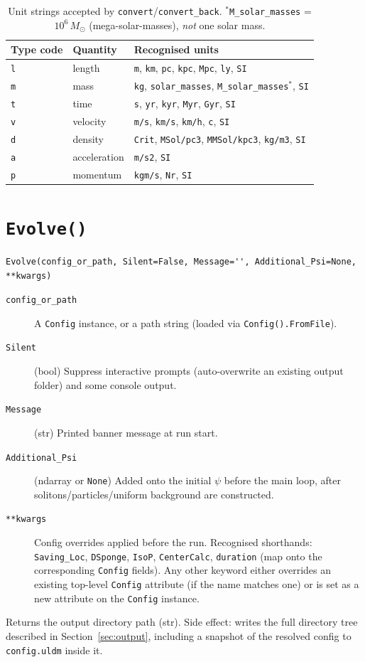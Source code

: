 \documentclass[11pt]{article}
\newcommand{\code}[1]{\texttt{#1}}
\newcommand{\field}[1]{\texttt{#1}}
\begin{document}
\begin{table}[h]
\centering
\begin{tabular}{@{}lll@{}}
\toprule
Type code & Quantity & Recognised units \\
\midrule
\code{l} & length & \code{m}, \code{km}, \code{pc}, \code{kpc}, \code{Mpc}, \code{ly}, \code{SI} \\
\code{m} & mass & \code{kg}, \code{solar\_masses}, \code{M\_solar\_masses}$^*$, \code{SI} \\
\code{t} & time & \code{s}, \code{yr}, \code{kyr}, \code{Myr}, \code{Gyr}, \code{SI} \\
\code{v} & velocity & \code{m/s}, \code{km/s}, \code{km/h}, \code{c}, \code{SI} \\
\code{d} & density & \code{Crit}, \code{MSol/pc3}, \code{MMSol/kpc3}, \code{kg/m3}, \code{SI} \\
\code{a} & acceleration & \code{m/s2}, \code{SI} \\
\code{p} & momentum & \code{kgm/s}, \code{Nr}, \code{SI} \\
\bottomrule
\end{tabular}
\caption{Unit strings accepted by \code{convert}/\code{convert\_back}.
$^*$\code{M\_solar\_masses} = $10^6\,M_\odot$ (mega-solar-masses), \emph{not}
one solar mass.}
\label{tab:units}
\end{table}

\section{\code{Evolve()}}
\label{sec:evolve}

\begin{verbatim}
Evolve(config_or_path, Silent=False, Message='', Additional_Psi=None, **kwargs)
\end{verbatim}
\begin{description}
  \item[\field{config\_or\_path}] A \code{Config} instance, or a path string
    (loaded via \code{Config().FromFile}).
  \item[\field{Silent}] (bool) Suppress interactive prompts (auto-overwrite an
    existing output folder) and some console output.
  \item[\field{Message}] (str) Printed banner message at run start.
  \item[\field{Additional\_Psi}] (ndarray or \code{None}) Added onto the
    initial $\psi$ before the main loop, after solitons/particles/uniform
    background are constructed.
  \item[\field{**kwargs}] Config overrides applied before the run. Recognised
    shorthands: \field{Saving\_Loc}, \field{DSponge}, \field{IsoP},
    \field{CenterCalc}, \field{duration} (map onto the corresponding
    \code{Config} fields). Any other keyword either overrides an existing
    top-level \code{Config} attribute (if the name matches one) or is set as a
    new attribute on the \code{Config} instance.
\end{description}
Returns the output directory path (str). Side effect: writes the full
directory tree described in Section~\ref{sec:output}, including a snapshot of
the resolved config to \code{config.uldm} inside it.
\end{document}
